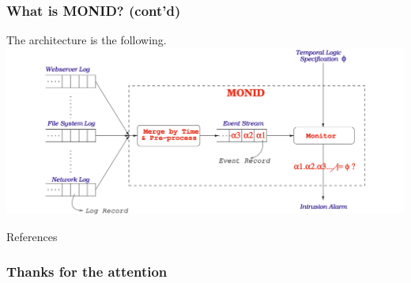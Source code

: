 \documentclass[aspectratio=169,t,xcolor=table]{beamer}
\begin{document}
\begin{frame}
    \frametitle{What is MONID? (cont'd)}
    The architecture is the following.\\
    \vspace{5mm}
    \includegraphics[scale=0.25]{images/monid.png}
\end{frame}





\begin{frame}[allowframebreaks]{References}
    \nocite{*} 
    \printbibliography
\end{frame}

\begin{frame}{}
    \frametitle{Thanks for the attention}
\end{frame}
\end{document}
